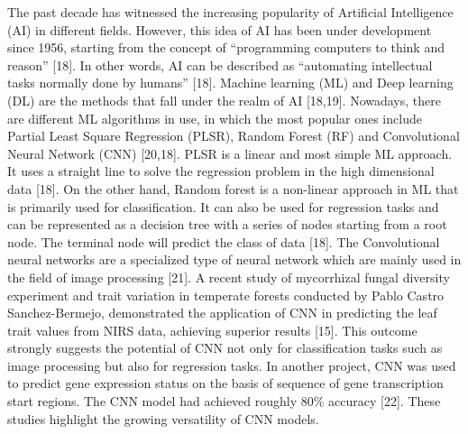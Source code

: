 \documentclass[12pt,a4paper]{article}
\begin{document}
The past decade has witnessed the increasing popularity of  Artificial Intelligence (AI) in different fields. However, this idea of AI has been under development since 1956, starting from the concept of “programming computers to think and reason” [18]. In other words, AI can be described as “automating intellectual tasks normally done by humans” [18]. Machine learning (ML) and Deep learning (DL) are the methods that fall under the realm of AI [18,19]. 
Nowadays, there are different ML algorithms in use, in which the most popular ones include Partial Least Square Regression (PLSR), Random Forest (RF) and Convolutional Neural Network (CNN) [20,18]. PLSR is a linear and most simple ML approach. It uses a straight line to solve the regression problem in the high dimensional data [18]. On the other hand,  Random forest is a non-linear approach in ML that is primarily used for classification. It can also 
be used for regression tasks and can be represented as a decision tree with a series of nodes starting from a root node. The terminal node will predict the class of data [18]. The Convolutional neural networks are a specialized type of neural network which are mainly used in the field of image processing [21]. A recent study of mycorrhizal fungal diversity experiment and  trait variation in temperate forests  conducted by Pablo Castro Sanchez-Bermejo, 
demonstrated the application of CNN in predicting the leaf trait values from NIRS data, achieving superior results [15]. This outcome strongly suggests the potential of CNN not only for classification tasks such as image processing but also for regression tasks. In another project, CNN was used to predict gene expression status on the basis of sequence of gene transcription start regions. The CNN model had achieved roughly 80\% accuracy [22]. 
These studies highlight the growing versatility of CNN models. \\
\end{document}
